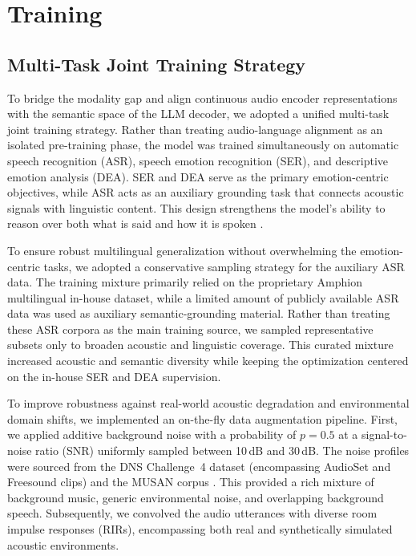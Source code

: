 \section{Training}

\subsection{Multi-Task Joint Training Strategy}

To bridge the modality gap and align continuous audio encoder representations with the semantic space of the LLM decoder, we adopted a unified multi-task joint training strategy. Rather than treating audio-language alignment as an isolated pre-training phase, the model was trained simultaneously on automatic speech recognition (ASR), speech emotion recognition (SER), and descriptive emotion analysis (DEA). SER and DEA serve as the primary emotion-centric objectives, while ASR acts as an auxiliary grounding task that connects acoustic signals with linguistic content. This design strengthens the model's ability to reason over both what is said and how it is spoken \cite{Qwen-Audio, SALMONN}.

To ensure robust multilingual generalization without overwhelming the emotion-centric tasks, we adopted a conservative sampling strategy for the auxiliary ASR data. The training mixture primarily relied on the proprietary Amphion multilingual in-house dataset, while a limited amount of publicly available ASR data was used as auxiliary semantic-grounding material. Rather than treating these ASR corpora as the main training source, we sampled representative subsets only to broaden acoustic and linguistic coverage. This curated mixture increased acoustic and semantic diversity while keeping the optimization centered on the in-house SER and DEA supervision.

To improve robustness against real-world acoustic degradation and environmental domain shifts, we implemented an on-the-fly data augmentation pipeline. First, we applied additive background noise with a probability of $p{=}0.5$ at a signal-to-noise ratio (SNR) uniformly sampled between 10\,dB and 30\,dB. The noise profiles were sourced from the DNS Challenge~4 dataset (encompassing AudioSet \cite{AudioSet} and Freesound \cite{Freesound} clips) and the MUSAN corpus \cite{Musan}. This provided a rich mixture of background music, generic environmental noise, and overlapping background speech. Subsequently, we convolved the audio utterances with diverse room impulse responses (RIRs), encompassing both real and synthetically simulated acoustic environments.

